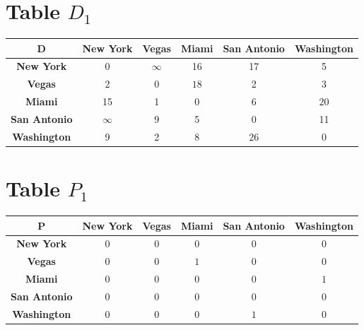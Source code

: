 \documentclass{article}
\begin{document}
\section{Table $D_{1}$}
\begin{center}
    \begin{tabular}{|c||c|c|c|c|c|}
        \hline
        \textbf{D} & \textbf{New York} & \textbf{Vegas} & \textbf{Miami} & \textbf{San Antonio} & \textbf{Washington} \\
        \hline
        \hline
        \textbf{New York}& 0 & $\infty$ & 16 & 17 & 5 \\
        \hline
        \textbf{Vegas}& 2 & 0 & \cellcolor[HTML]{D74894}$18$ & 2 & 3 \\
        \hline
        \textbf{Miami}& 15 & 1 & 0 & 6 & \cellcolor[HTML]{D74894}$20$ \\
        \hline
        \textbf{San Antonio}& $\infty$ & 9 & 5 & 0 & 11 \\
        \hline
        \textbf{Washington}& 9 & 2 & 8 & \cellcolor[HTML]{D74894}$26$ & 0 \\
        \hline
    \end{tabular}
\end{center}


\section{Table $P_{1}$}
\begin{center}
    \begin{tabular}{|c||c|c|c|c|c|}
        \hline
        \textbf{P} & \textbf{New York} & \textbf{Vegas} & \textbf{Miami} & \textbf{San Antonio} & \textbf{Washington} \\
        \hline
        \hline
        \textbf{New York}& 0 & 0 & 0 & 0 & 0 \\
        \hline
        \textbf{Vegas}& 0 & 0 & \cellcolor[HTML]{D74894}$1$ & 0 & 0 \\
        \hline
        \textbf{Miami}& 0 & 0 & 0 & 0 & \cellcolor[HTML]{D74894}$1$ \\
        \hline
        \textbf{San Antonio}& 0 & 0 & 0 & 0 & 0 \\
        \hline
        \textbf{Washington}& 0 & 0 & 0 & \cellcolor[HTML]{D74894}$1$ & 0 \\
        \hline
    \end{tabular}
\end{center}
\end{document}
